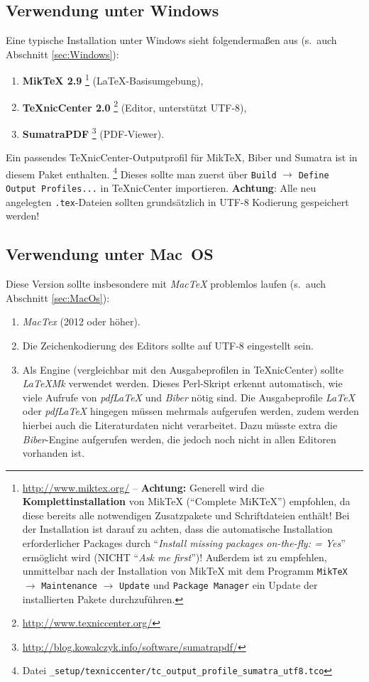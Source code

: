 \subsection{Verwendung unter Windows}
\label{sec:VerwendungUnterWindows}

Eine typische Installation unter Windows sieht folgendermaßen aus
(s.\ auch Abschnitt \ref{sec:Windows}):
%
\begin{enumerate}
\item \textbf{MikTeX 2.9}%
	\footnote{\url{http://www.miktex.org/} -- \textbf{Achtung:} 
	Generell wird die \textbf{Komplett\-installation} von MikTeX ("`Complete MiKTeX"') empfohlen, 
	da diese bereits alle notwendigen Zusatzpakete und Schriftdateien enthält! 
	Bei der Installation ist darauf zu achten, 
	dass die automatische Installation erforderlicher Packages 
	durch "`\emph{Install missing packages on-the-fly: = Yes}"' ermöglicht wird (NICHT "`\emph{Ask me first}"')!
	Außerdem ist zu empfehlen, unmittelbar nach der Installation von MikTeX mit dem Programm
	\texttt{MikTeX} $\to$ \texttt{Maintenance} $\to$ \texttt{Update} und \texttt{Package Manager} 
	ein Update der installierten Pakete durchzuführen.}
	(LaTeX-Basisumgebung),
\item \textbf{TeXnicCenter 2.0}%
	\footnote{\url{http://www.texniccenter.org/}}
	(Editor, unterstützt UTF-8),
\item \textbf{SumatraPDF}%
	\footnote{\url{http://blog.kowalczyk.info/software/sumatrapdf/}} 
	(PDF-Viewer).
\end{enumerate}
%
Ein passendes TeXnicCenter-Outputprofil für MikTeX, Biber und Sumatra ist in diesem Paket enthalten.%
\footnote{Datei \nolinkurl{_setup/texniccenter/tc_output_profile_sumatra_utf8.tco}} 
Dieses sollte man zuerst
über \texttt{Build} $\to$ \texttt{Define Output Profiles...} in TeXnicCenter importieren.
\textbf{Achtung}: Alle neu angelegten \texttt{.tex}-Dateien sollten grundsätzlich in UTF-8 Kodierung gespeichert werden!


\subsection{Verwendung unter Mac~OS}

Diese Version sollte insbesondere mit \emph{MacTeX} problemlos laufen (s.\ auch Abschnitt \ref{sec:MacOs}):
\begin{enumerate}
\item 
	\emph{MacTex} (2012 oder höher).
\item 
	Die Zeichenkodierung des Editors sollte auf UTF-8 eingestellt sein.
\item 
	Als Engine (vergleichbar mit den Ausgabeprofilen in TeXnicCenter) sollte \emph{LaTeXMk} verwendet werden. 
	Dieses Perl-Skript erkennt automatisch, wie viele Aufrufe von \emph{pdfLaTeX} und \emph{Biber} nötig sind. 
	Die Ausgabeprofile \emph{LaTeX} oder \emph{pdfLaTeX} hingegen müssen mehrmals aufgerufen werden, 
	zudem werden hierbei auch die Literaturdaten nicht verarbeitet. Dazu müsste extra die \emph{Biber}-Engine 
	aufgerufen werden, 	die jedoch noch nicht in allen Editoren vorhanden ist.
\end{enumerate}
